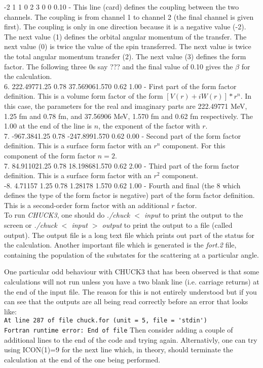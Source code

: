 \documentclass[a4paper,10pt]{article}
\begin{document}
 -2  1  1  0  2  3  0  0 0.10 - This line (card) defines the coupling between the two channels. The coupling is from channel 1 to channel 2 (the final channel is given first). The coupling is only in one direction because it is a negative value (-2). The next value (1) defines the orbital angular momentum of the transfer. The next value (0) is twice the value of the spin transferred. The next value is twice the total angular momentum transfer (2). The next value (3) defines the form factor. The following three 0s say ??? and the final value of 0.10 gives the $\beta$ for the calculation. \\
6.      222.49771.25    0.78            37.569061.570   0.62            1.00 - First part of the form factor definition. This is a volume form factor of the form $[V(r) + iW(r)] * r^n$. In this case, the parameters for the real and imaginary parts are 222.49771 MeV, 1.25 fm and 0.78 fm, and 37.56906 MeV, 1.570 fm and 0.62 fm respectively. The 1.00 at the end of the line is $n$, the exponent of the factor with $r$.\\
7.      -967.3841.25    0.78            -247.8991.570   0.62            0.00 - Second part of the form factor definition. This is a surface form factor with an $r^n$ component. For this component of the form factor $n=2$.\\
7.      84.911021.25    0.78            18.198681.570   0.62            2.00 - Third part of the form factor definition. This is a surface form factor with an $r^2$ component.\\
-8.     4.71157 1.25    0.78            1.28178 1.570   0.62            1.00 - Fourth and final (the 8 which defines the type of the form factor is negative) part of the form factor definition. This is a second-order form factor with an additional $r$ factor.\\

To run {\it CHUCK3}, one should do {\it ./chuck $<$ input} to print the output to the screen or {\it ./chuck $<$ input $>$ output} to print the output to a file (called output). The output file is a long text file which prints out part of the status for the calculation. Another important file which is generated is the {\it fort.2} file, containing the population of the substates for the scattering at a particular angle.

One particular odd behaviour with CHUCK3 that has been observed is that some calculations will not run unless you have a two blank line (i.e. carriage returns) at the end of the input file. The reason for this is not entirely understood but if you can see that the outputs are all being read correctly before an error that looks like:\\ \lstinline!At line 287 of file chuck.for (unit = 5, file = 'stdin')!\\ \lstinline!Fortran runtime error: End of file!
Then consider adding a couple of additional lines to the end of the code and trying again. Alternativly, one can try using ICON(1)=9 for the next line which, in theory, should terminate the calculation at the end of the one being performed.
\end{document}
